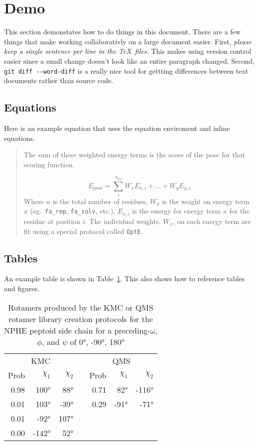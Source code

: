 \section{Demo}
This section demonstates how to do things in this document.
There are a few things that make working collaborativly on a large document easier. 
First, \textit{please keep a single sentence per line in the \TeX\ files.}
This makes using version control easier since a small change doesn't look like an entire paragraph changed.
Second, \texttt{git diff -{}-word-diff} is a really nice tool for gettting differences between text documents rather than source code.

\subsection{Equations}
Here is an example equation that uses the equation enviroment and inline equations.
\begin{quote}
The sum of these weighted energy terms is the score of the pose for that scoring function. 

\begin{equation}
E_{\text{pose}} = \sum_{i}^{n_{\text{res}}} W_{x} E_{x,i} + ... + W_{y} E_{y,i}
\end{equation}
Where $n$ is the total number of residues, $W_{x}$ is the weight on energy term $x$ (eg.\ \texttt{fa\_rep}, \texttt{fa\_solv}, etc.), $E_{x,i}$ is the energy for energy term $x$ for the residue at position $i$. 
The individual weights, $W_x$, on each energy term are fit using a special protocol called \texttt{OptE}.
\end{quote}

\subsection{Tables}
An example table is shown in Table~\ref{supptbl:rot_lib_snpshot_nmeo}.
This also shows how to reference tables and figures.

\begin{table}
  \centering
  \caption{Rotamers produced by the KMC or QMS rotamer library creation protocols for the NPHE peptoid side chain for a preceding-$\omega$, $\phi$, and $\psi$ of \ang{0}, \ang{-90}, \ang{180}}
  \label{supptbl:rot_lib_snpshot_nmeo}
  \begin{tabular}{rrrcrrr}
    \toprule
    \multicolumn{3}{c}{KMC} && \multicolumn{3}{c}{QMS} \\
    \cmidrule{1-3} \cmidrule{5-7}
    Prob & $\chi_1$  & $\chi_2$ && Prob & $\chi_1$  & $\chi_2$ \\
    \midrule
    0.98 & \ang{100}  &  \ang{88}  && 0.71 & \ang{82}  &  \ang{-116} \\
    0.01 & \ang{103}  &  \ang{-39} && 0.29 & \ang{-91} &  \ang{-71}  \\
    0.01 & \ang{-92}  &  \ang{107} && ~ & ~ & ~ \\
    0.00 & \ang{-142} &  \ang{52}  && ~ & ~ & ~ \\
    \bottomrule
  \end{tabular}
\end{table}

